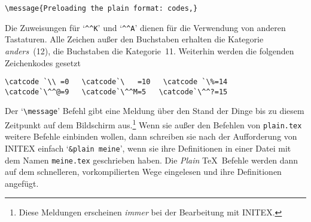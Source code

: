 \begin{appendix}
\begin{verbatim}
\message{Preloading the plain format: codes,}
\end{verbatim}
Die Zuweisungen f\"ur `\verb|^^K|' und `\verb|^^A|' dienen f\"ur die
Verwendung von anderen Tastaturen. Alle Zeichen au\ss{}er den Buchstaben
erhalten die Kategorie {\em anders}~(12), die Buchstaben die
Kategorie~11. Weiterhin werden die folgenden Zeichenkodes gesetzt
\begin{verbatim}
\catcode `\\ =0   \catcode`\   =10   \catcode `\%=14
\catcode`\^^@=9   \catcode`\^^M=5   \catcode`\^^?=15
\end{verbatim}
Der `\verb|\message|' Befehl gibt eine Meldung \"uber den Stand der
Dinge bis zu diesem Zeitpunkt auf dem 
Bildschirm aus.\footnote{Diese
Meldungen erscheinen {\em immer} bei der Bearbeitung mit INITEX.} Wenn
sie au\ss{}er den Befehlen von {\tt plain.tex} weitere Befehle einbinden
wollen, dann schreiben sie nach der Aufforderung von INITEX einfach
`\verb|&plain meine|', wenn sie ihre Definitionen in einer Datei mit
dem Namen {\tt meine.tex} geschrieben haben. Die {\em Plain} \TeX\
Befehle werden dann auf dem schnelleren, vorkompilierten Wege
eingelesen und ihre Definitionen angef\"ugt.


\end{appendix}
